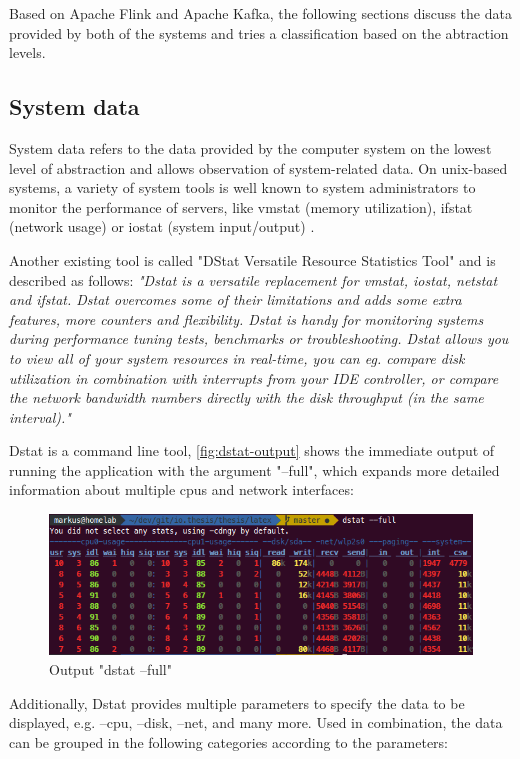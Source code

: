 Based on Apache Flink and Apache Kafka, the following sections discuss the data provided
by both of the systems and tries a classification based on the abtraction levels.

\subsection{System data}

System data refers to the data provided by the computer system on the lowest level of
abstraction and allows observation of system-related data. On unix-based systems, a
variety of system tools is well known to system administrators to monitor the performance
of servers, like vmstat (memory utilization), ifstat (network usage) or iostat (system
input/output) \cite{Hoeb12}.

Another existing tool is called "DStat Versatile Resource Statistics Tool" and is described
as follows: \textit{"Dstat is a versatile replacement for vmstat, iostat, netstat and ifstat. Dstat
overcomes some of their limitations and adds some extra features, more counters and flexibility.
Dstat is handy for monitoring systems during performance tuning tests, benchmarks
or troubleshooting. Dstat allows you to view all of your system resources in real-time, you
can eg. compare disk utilization in combination with interrupts from your IDE controller,
or compare the network bandwidth numbers directly with the disk throughput (in the same
interval)."}\cite{Wieers16}

Dstat is a command line tool, \autoref{fig:dstat-output} shows the immediate output of running
the application with the argument "--full", which expands more detailed information about
multiple cpus and network interfaces:

\begin{figure}[H]
	\centering
	\includegraphics[width=1.0\textwidth]{../images/06-dstat-full.png}
	\caption{Output "dstat --full"}
	\label{fig:dstat-output}
\end{figure}

Additionally, Dstat provides multiple parameters to specify the data to be displayed, e.g.
--cpu, --disk, --net, and many more. Used in combination, the data can be grouped in the
following categories according to the parameters:

